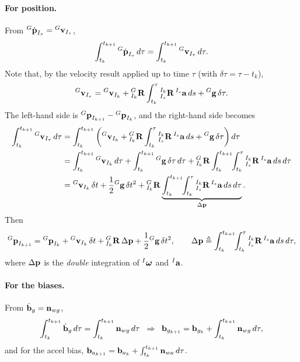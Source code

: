 \paragraph{For position.} From ${}^{G}\dot{\boldsymbol{\mathbf{p}}}_{I_\tau} = {}^{G}\boldsymbol{\mathbf{v}}_{I_\tau}$,
\begin{align}
\int_{t_k}^{t_{k+1}} {}^{G}\dot{\boldsymbol{\mathbf{p}}}_{I_\tau}\,d\tau = \int_{t_k}^{t_{k+1}} {}^{G}\boldsymbol{\mathbf{v}}_{I_\tau}\,d\tau.
\end{align}
Note that, by the velocity result applied up to time $\tau$ (with $\delta\tau = \tau - t_k$),
\begin{align}
{}^{G}\boldsymbol{\mathbf{v}}_{I_\tau} = {}^{G}\boldsymbol{\mathbf{v}}_{I_k} + {}^{G}_{I_k}\boldsymbol{\mathbf{R}}\int_{t_k}^{\tau} {}^{I_k}_{I_s}\boldsymbol{\mathbf{R}}\,{}^{I_s}\boldsymbol{\mathbf{a}}\,ds + {}^{G}\boldsymbol{\mathbf{g}}\,\delta\tau.
\end{align}
The left-hand side is ${}^{G}\boldsymbol{\mathbf{p}}_{I_{k+1}} - {}^{G}\boldsymbol{\mathbf{p}}_{I_k}$, and the right-hand side becomes
\begin{align}
\int_{t_k}^{t_{k+1}} {}^{G}\boldsymbol{\mathbf{v}}_{I_\tau}\,d\tau
&= \int_{t_k}^{t_{k+1}} \left( {}^{G}\boldsymbol{\mathbf{v}}_{I_k} + {}^{G}_{I_k}\boldsymbol{\mathbf{R}}\int_{t_k}^{\tau} {}^{I_k}_{I_s}\boldsymbol{\mathbf{R}}\,{}^{I_s}\boldsymbol{\mathbf{a}}\,ds + {}^{G}\boldsymbol{\mathbf{g}}\,\delta\tau \right) d\tau \\
&= \int_{t_k}^{t_{k+1}} {}^{G}\boldsymbol{\mathbf{v}}_{I_k}\,d\tau + \int_{t_k}^{t_{k+1}} {}^{G}\boldsymbol{\mathbf{g}}\,\delta\tau\,d\tau + {}^{G}_{I_k}\boldsymbol{\mathbf{R}}\int_{t_k}^{t_{k+1}}\!\!\int_{t_k}^{\tau} {}^{I_k}_{I_s}\boldsymbol{\mathbf{R}}\,{}^{I_s}\boldsymbol{\mathbf{a}}\,ds\,d\tau \\
&= {}^{G}\boldsymbol{\mathbf{v}}_{I_k}\,\delta t + \frac{1}{2}{}^{G}\boldsymbol{\mathbf{g}}\,\delta t^2 + {}^{G}_{I_k}\boldsymbol{\mathbf{R}}\underbrace{\int_{t_k}^{t_{k+1}}\!\!\int_{t_k}^{\tau} {}^{I_k}_{I_s}\boldsymbol{\mathbf{R}}\,{}^{I_s}\boldsymbol{\mathbf{a}}\,ds\,d\tau}_{\Delta\boldsymbol{\mathbf{p}}}.
\end{align}
Then
\begin{align}
{}^{G}\boldsymbol{\mathbf{p}}_{I_{k+1}} = {}^{G}\boldsymbol{\mathbf{p}}_{I_k} + {}^{G}\boldsymbol{\mathbf{v}}_{I_k}\,\delta t + {}^{G}_{I_k}\boldsymbol{\mathbf{R}}\,\Delta\boldsymbol{\mathbf{p}} + \frac{1}{2}{}^{G}\boldsymbol{\mathbf{g}}\,\delta t^2,
\qquad
\Delta\boldsymbol{\mathbf{p}} \triangleq \int_{t_k}^{t_{k+1}}\!\!\int_{t_k}^{\tau} {}^{I_k}_{I_s}\boldsymbol{\mathbf{R}}\,{}^{I_s}\boldsymbol{\mathbf{a}}\,ds\,d\tau,
\end{align}
where $\Delta\boldsymbol{\mathbf{p}}$ is the \emph{double} integration of ${}^{I}\boldsymbol{\mathbf{\omega}}$ and ${}^{I}\boldsymbol{\mathbf{a}}$.

\paragraph{For the biases.} From $\dot{\boldsymbol{\mathbf{b}}}_g = \boldsymbol{\mathbf{n}}_{wg}$,
\begin{align}
\int_{t_k}^{t_{k+1}} \dot{\boldsymbol{\mathbf{b}}}_g\,d\tau = \int_{t_k}^{t_{k+1}} \boldsymbol{\mathbf{n}}_{wg}\,d\tau
\;\;\Rightarrow\;\;
\boldsymbol{\mathbf{b}}_{g_{k+1}} = \boldsymbol{\mathbf{b}}_{g_k} + \int_{t_k}^{t_{k+1}} \boldsymbol{\mathbf{n}}_{wg}\,d\tau,
\end{align}
and for the accel bias, $\boldsymbol{\mathbf{b}}_{a_{k+1}} = \boldsymbol{\mathbf{b}}_{a_k} + \int_{t_k}^{t_{k+1}} \boldsymbol{\mathbf{n}}_{wa}\,d\tau$.

